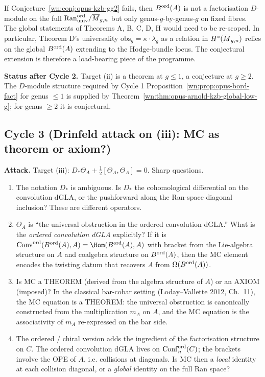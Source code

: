 \begin{remark}
\label{wn:rem:opus-kzb-failure}
If Conjecture~\ref{wn:conj:opus-kzb-gg2} fails, then $B^{\mathrm{ord}}(A)$ is not
a factorisation $D$-module on the full
$\mathrm{Ran}^{\mathrm{ord}}_{\mathrm{univ}} / \overline{M}_{g,n}$ but only
genus-$g$-by-genus-$g$ on fixed fibres. The global statements of
Theorems A, B, C, D, H would need to be re-scoped. In particular,
Theorem D's universality $\mathrm{obs}_g = \kappa \cdot \lambda_g$ as
a relation in $H^*(\overline{M}_{g,n})$ relies on the global
$B^{\mathrm{ord}}(A)$ extending to the Hodge-bundle locus. The conjectural
extension is therefore a load-bearing piece of the programme.
\end{remark}

\textbf{Status after Cycle 2.} Target (ii) is a theorem at $g \le 1$,
a conjecture at $g \ge 2$. The $D$-module structure required by
Cycle 1 Proposition~\ref{wn:prop:opus-bord-fact} for genus $\le 1$ is
supplied by Theorem~\ref{wn:thm:opus-arnold-kzb-global-low-g}; for genus
$\ge 2$ it is conjectural.

\subsection*{Cycle 3 (Drinfeld attack on (iii): MC as theorem or axiom?)}

\textbf{Attack.} Target (iii): $D_* \Theta_A + \tfrac{1}{2} [\Theta_A,
\Theta_A] = 0$. Sharp questions.

\begin{enumerate}
\item[Q9.] The notation $D_*$ is ambiguous. Is $D_*$ the cohomological
differential on the convolution dGLA, or the pushforward along the
Ran-space diagonal inclusion? These are different operators.
\item[Q10.] $\Theta_A$ is ``the universal obstruction in the ordered
convolution dGLA.'' What is the \emph{ordered convolution dGLA}
explicitly? If it is
$\mathrm{Conv}^{\mathrm{ord}}(\Bord(A), A) = \Hom(\Bord(A), A)$ with
bracket from the Lie-algebra structure on $A$ and coalgebra structure on
$B^{\mathrm{ord}}(A)$, then the MC element encodes the twisting datum that recovers
$A$ from $\Omega(B^{\mathrm{ord}}(A))$.
\item[Q11.] Is MC a THEOREM (derived from the algebra structure of $A$)
or an AXIOM (imposed)? In the classical bar-cobar setting (Loday--Vallette
2012, Ch.\ 11), the MC equation is a THEOREM: the universal obstruction
is canonically constructed from the multiplication $m_A$ on $A$, and the
MC equation is the associativity of $m_A$ re-expressed on the bar side.
\item[Q12.] The ordered / chiral version adds the ingredient of the
factorisation structure on $C$. The ordered convolution dGLA lives on
$\mathrm{Conf}_n^{\mathrm{ord}}(C)$; the brackets involve the OPE of $A$, i.e.
collisions at diagonals. Is MC then a \emph{local} identity at each
collision diagonal, or a \emph{global} identity on the full Ran space?
\end{enumerate}

